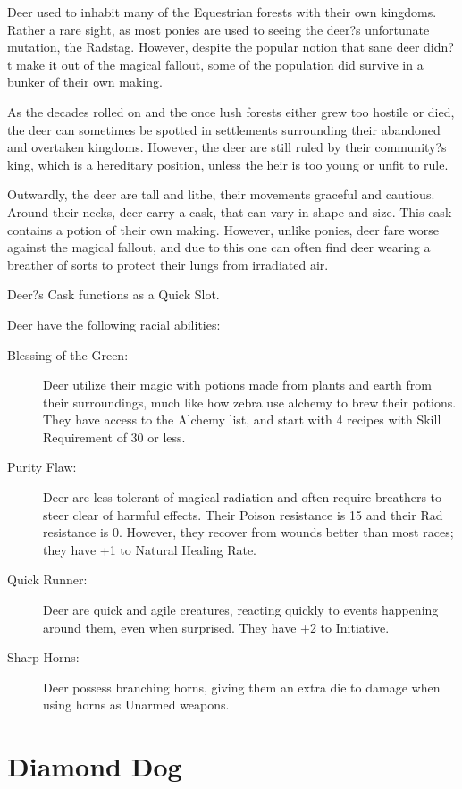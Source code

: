 \documentclass[11pt,a4paper,twocolumn]{book}
\begin{document}
	Deer used to inhabit many of the Equestrian forests with their own kingdoms. Rather a  rare sight, as most ponies are used to seeing the deer?s unfortunate mutation, the Radstag. However, despite the popular notion that sane deer didn?t make it out of the magical fallout, some of the population did survive in a bunker of their own making.
	
	As the decades rolled on and the once lush forests either grew too hostile or died, the deer can sometimes be spotted in settlements surrounding their abandoned and overtaken kingdoms. However, the deer are still ruled by their community?s king, which is a hereditary position, unless the heir is too young or unfit to rule. 
	
	Outwardly, the deer are tall and lithe, their movements graceful and cautious. Around their necks, deer carry a cask, that can vary in shape and size. This cask contains a potion of their own making. However, unlike ponies, deer fare worse against the magical fallout, and due to this one can often find deer wearing a breather of sorts to protect their lungs from irradiated air.
	
	Deer?s Cask functions as a Quick Slot.
	
	Deer have the following racial abilities:
	\begin{description}
		\item[Blessing of the Green:] Deer utilize their magic with potions made from plants and earth from their surroundings, much like how zebra use alchemy to brew their potions. They have access to the Alchemy list, and start with 4 recipes with Skill Requirement of 30 or less.
		\item[Purity Flaw:] Deer are less tolerant of magical radiation and often require breathers to steer clear of harmful effects. Their Poison resistance is 15 and their Rad resistance is 0. However, they recover from wounds better than most races; they have +1 to Natural Healing Rate.
		\item[Quick Runner:] Deer are quick and agile creatures, reacting quickly to events happening around them, even when surprised. They have +2 to Initiative.
		\item[Sharp Horns:] Deer possess branching horns, giving them an extra die to damage when using horns as Unarmed weapons.
	\end{description}

	\clearpage
	
	\section*{Diamond Dog}
	
\end{document}
